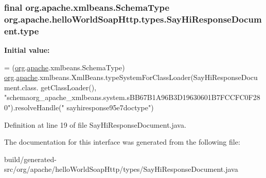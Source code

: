 \subsubsection[{type}]{\setlength{\rightskip}{0pt plus 5cm}final org.\+apache.\+xmlbeans.\+Schema\+Type org.\+apache.\+hello\+World\+Soap\+Http.\+types.\+Say\+Hi\+Response\+Document.\+type\hspace{0.3cm}{\ttfamily [static]}}\label{interfaceorg_1_1apache_1_1hello_world_soap_http_1_1types_1_1_say_hi_response_document_a6b01a80aaf0b72fe367d9fdc9f179db7}
{\bfseries Initial value\+:}
\begin{DoxyCode}
= (\hyperlink{namespaceorg}{org}.\hyperlink{namespaceorg_1_1apache}{apache}.xmlbeans.SchemaType)
        \hyperlink{namespaceorg}{org}.\hyperlink{namespaceorg_1_1apache}{apache}.xmlbeans.XmlBeans.typeSystemForClassLoader(SayHiResponseDocument.class.
      getClassLoader(), \textcolor{stringliteral}{"schemaorg\_apache\_xmlbeans.system.sBB67B1A96B3D19630601B7FCCFC0F280"}).resolveHandle(\textcolor{stringliteral}{"
      sayhiresponse95e7doctype"})
\end{DoxyCode}


Definition at line 19 of file Say\+Hi\+Response\+Document.\+java.



The documentation for this interface was generated from the following file\+:\begin{DoxyCompactItemize}
\item 
build/generated-\/src/org/apache/hello\+World\+Soap\+Http/types/Say\+Hi\+Response\+Document.\+java\end{DoxyCompactItemize}
